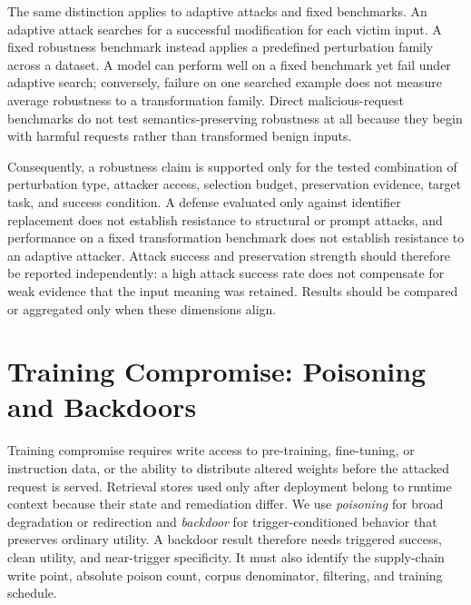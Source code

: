 \documentclass[acmsmall,screen,review]{acmart}
\begin{document}
The same distinction applies to adaptive attacks and fixed benchmarks. An adaptive attack searches for a successful modification for each victim input. A fixed robustness benchmark instead applies a predefined perturbation family across a dataset. A model can perform well on a fixed benchmark yet fail under adaptive search; conversely, failure on one searched example does not measure average robustness to a transformation family. Direct malicious-request benchmarks do not test semantics-preserving robustness at all because they begin with harmful requests rather than transformed benign inputs.

Consequently, a robustness claim is supported only for the tested combination of perturbation type, attacker access, selection budget, preservation evidence, target task, and success condition. A defense evaluated only against identifier replacement does not establish resistance to structural or prompt attacks, and performance on a fixed transformation benchmark does not establish resistance to an adaptive attacker. Attack success and preservation strength should therefore be reported independently: a high attack success rate does not compensate for weak evidence that the input meaning was retained. Results should be compared or aggregated only when these dimensions align.

\section{Training Compromise: Poisoning and Backdoors} \label{sec:poison}

Training compromise requires write access to pre-training, fine-tuning, or instruction data, or the ability to distribute altered weights before the attacked request is served. Retrieval stores used only after deployment belong to runtime context because their state and remediation differ. We use \emph{poisoning} for broad degradation or redirection and \emph{backdoor} for trigger-conditioned behavior that preserves ordinary utility. A backdoor result therefore needs triggered success, clean utility, and near-trigger specificity. It must also identify the supply-chain write point, absolute poison count, corpus denominator, filtering, and training schedule.
\end{document}
